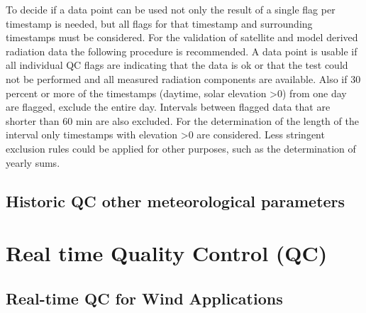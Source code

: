 To decide if a data point can be used not only the result of a single flag per timestamp is needed, but all flags for that timestamp and surrounding timestamps must be considered. For the validation of satellite and model derived radiation data the following procedure is recommended. A data point is usable if all individual QC flags are indicating that the data is ok or that the test could not be performed and all measured radiation components are available. Also if 30 percent or more of the timestamps (daytime, solar elevation >0) from one day are flagged, exclude the entire day. Intervals between flagged data that are shorter than 60 min are also excluded. For the determination of the length of the interval only timestamps with elevation >0 are considered. Less stringent exclusion rules could be applied for other purposes, such as the determination of yearly sums.

\subsection{Historic QC other meteorological parameters {\color{red}{Comment from COM (21.08.2021: Do we really need that ? }}}

\section{Real time Quality Control (QC)}








\subsection{Real-time QC for Wind Applications}
{\color{blue}{Comment from COM (23.08.2021: Needs clean up!!! }}

